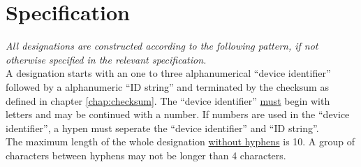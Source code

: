 %
%
%
%
%
%
%

\section{Specification}

\textit{All designations are constructed according to the following pattern, if
not otherwise specified in the relevant specification.} \\


A designation starts with an one to three alphanumerical ``device identifier''
followed by a alphanumeric ``ID string'' and terminated by the checksum as
defined in chapter \ref{chap:checksum}. The ``device identifier''
\underline{must} begin with letters and may be continued with a number. If
numbers are used in the ``device identifier'', a hypen must seperate the
``device identifier'' and ``ID string''. \\

The maximum length of the whole designation \underline{without hyphens} is 10. A
group of characters between hyphens may not be longer than 4 characters.



%
%




